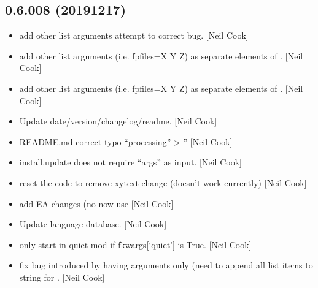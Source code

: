 \documentclass[a4paper,10pt,english]{report}
\begin{document}
\subsection{0.6.008 (2019\sphinxhyphen{}12\sphinxhyphen{}17)}
\label{\detokenize{misc/changelog:id30}}\begin{itemize}
\item {} 
 \sphinxhyphen{} add other list arguments \textendash{} attempt to
correct bug. {[}Neil Cook{]}

\item {} 
 \sphinxhyphen{} add other list arguments (i.e. \textendash{}fpfiles=X Y
Z) as separate elements of . {[}Neil Cook{]}

\item {} 
 \sphinxhyphen{} add other list arguments (i.e. \textendash{}fpfiles=X Y
Z) as separate elements of . {[}Neil Cook{]}

\item {} 
Update date/version/changelog/readme. {[}Neil Cook{]}

\item {} 
README.md \sphinxhyphen{} correct typo “processing” \textendash{}\textgreater{} ” {[}Neil
Cook{]}

\item {} 
 \sphinxhyphen{} install.update does not require “args” as input.
{[}Neil Cook{]}

\item {} 
 \sphinxhyphen{} reset the code to remove xytext change (doesn’t work
currently) {[}Neil Cook{]}

\item {} 
 \sphinxhyphen{} add EA changes (no  now use
 {[}Neil Cook{]}

\item {} 
Update language database. {[}Neil Cook{]}

\item {} 
 \sphinxhyphen{} only start in quiet mod if fkwargs{[}‘quiet’{]}
is True. {[}Neil Cook{]}

\item {} 
 \sphinxhyphen{} fix bug introduced by having \textendash{}arguments
only (need to append all list items to string for .
{[}Neil Cook{]}


\end{itemize}
\end{document}
